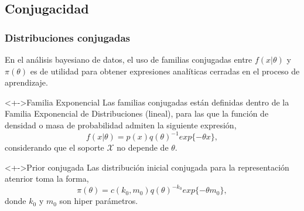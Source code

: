 \documentclass[cjk,t,compress]{beamer}
\begin{document}
	\subsection{Conjugacidad}
	\frame
	{
    \frametitle{Distribuciones conjugadas}
  		{\scriptsize  	
		
	  	En el an\'alisis bayesiano de datos, el uso de familias conjugadas entre $f(x|\theta)$ y $\pi(\theta)$ es de utilidad para obtener expresiones ana\l\'iticas cerradas en el proceso de aprendizaje.
	  	
		\begin{block}<+->{Familia Exponencial}
	  	{
	  	Las familias conjugadas est\'an definidas dentro de la  Familia Exponencial de Distribuciones (lineal), para las que la funci\'on de densidad o masa de probabilidad admiten la siguiente expresi\'on,
	  	\begin{equation}
	  		f(x|\theta) = p(x) q(\theta)^{-1} exp\{-\theta x\},
	  	\end{equation}
	  	considerando que el soporte $\mathcal{X}$ no depende de $\theta$.
	  	}
 		\end{block}  		

	  	\vspace{0.3cm}
		\begin{block}<+->{Prior conjugada}
	  	{
	  	Las distribuci\'on inicial conjugada para la representaci\'on atenrior toma la forma,
	  	\begin{equation}
	  		\pi(\theta) = c(k_0,m_0)q(\theta)^{-k_0} exp\{-\theta m_0\},
	  	\end{equation}
	  	donde $k_0$ y $m_0$ son hiper par\'ametros.
	  	}
 		\end{block}  		

		}
	}

\end{document}
